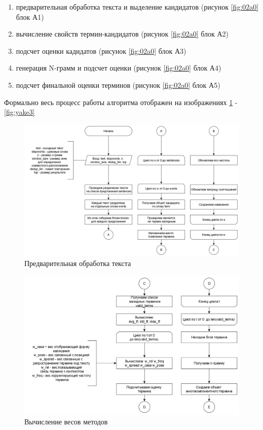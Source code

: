 \begin{enumerate}
	\item предварительная обработка текста и выделение кандидатов (рисунок \ref{fig:02a0} блок А1)
	\item вычисление свойств термин-кандидатов (рисунок \ref{fig:02a0} блок А2)
	\item подсчет оценки кадидатов (рисунок \ref{fig:02a0} блок А3)
	\item генерация N-грамм и подсчет оценки (рисунок \ref{fig:02a0} блок А4)
	\item подсчет финальной оценки терминов (рисунок \ref{fig:02a0} блок А5)
\end{enumerate}

Формально весь процесс работы алгоритма отображен на изображениях \ref{fig:yake1} - \ref{fig:yake3}
\begin{figure}[!h]
	\centering
	\includegraphics[width=0.9\linewidth]{src/img/design/yake_1}
	\caption{Предварительная обработка текста}
	\label{fig:yake1}
\end{figure}

\begin{figure}[!h]
	\centering
	\includegraphics[width=0.9\linewidth]{src/img/design/yake_2}
	\caption{Вычисление весов методов}
	\label{fig:yake2}
\end{figure}

